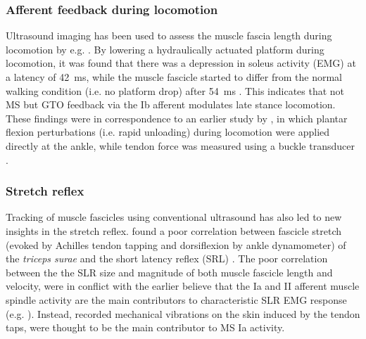 \subsubsection{Afferent feedback during locomotion}
Ultrasound imaging has been used to assess the muscle fascia length during locomotion by e.g. \citeauthor{klint_afferent_2009}. By lowering a hydraulically actuated platform during locomotion, it was found that there was a depression in soleus activity (EMG) at a latency of \SI{42}{\milli\second}, while the muscle fascicle started to differ from the normal walking condition (i.e. no platform drop) after \SI{54}{\milli\second} \cite{klint_afferent_2009}. This indicates that not MS but GTO feedback via the Ib afferent modulates late stance locomotion. These findings were in correspondence to an earlier study by \citeauthor{grey_positive_2007}, in which plantar flexion perturbations (i.e. rapid unloading) during locomotion were applied directly at the ankle, while tendon force was measured using a buckle transducer \cite{grey_positive_2007}. 




\subsubsection{Stretch reflex}
Tracking of muscle fascicles using conventional ultrasound has also led to new insights in the stretch reflex. \citeauthor{cronin_triceps_2015} found a poor correlation between fascicle stretch (evoked by Achilles tendon tapping and dorsiflexion by ankle dynamometer) of the \textit{triceps surae} and the short latency reflex (SRL) \cite{cronin_triceps_2015}. The poor correlation between the the SLR size and magnitude of both muscle fascicle length and velocity, were in conflict with the earlier believe that the Ia and II afferent muscle spindle activity are the main contributors to characteristic SLR EMG response (e.g. \cite{schuurmans_monosynaptic_2009}). Instead, recorded mechanical vibrations on the skin induced by the tendon taps, were thought to be the main contributor to MS Ia activity. %





